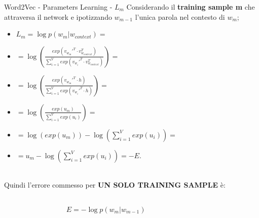 \documentclass[british]{beamer}
\begin{document}
\begin{frame}{Word2Vec - Parameters Learning - \(L_m\)}
	Considerando il \textbf{training sample m} che attraversa il network e ipotizzando \(w_{m-1}\) l'unica parola nel contesto di \(w_{m}\);
	\begin{itemize}
		\item \(L_m = \log p(w_{m}|w_{context}) = \)
		\item \(= \log \left( \frac{exp(v_{w_{m}}'^T \cdot v_{w_{context}}^T)}{\sum_{i=1}^{V} exp(v_{w_{i}}'^T \cdot v_{w_{context}}^T)} \right) =\) 
		\item \(= \log \left( \frac{exp(v_{w_{m}}'^T \cdot h)}{\sum_{i=1}^{V} exp(v_{w_{i}}'^T \cdot h)} \right) = \)
		\item \(= \log \left( \frac{exp(u_m)}{\sum_{i=1}^{V} exp(u_i)} \right) = \)
		\item \(= \log \left( exp(u_m) \right) - \log \left( \sum_{i=1}^{V} exp(u_i) \right) = \)
		\item \(= u_m - \log \left( \sum_{i=1}^{V} exp(u_i) \right) = -E. \)
		\\~\\
	\end{itemize}
	Quindi l'errore commesso per \textbf{UN SOLO TRAINING SAMPLE} \`{e}:
	\begin{columns}
		\begin{column}{0.3\textwidth}
			
		\end{column}
		\begin{column}{0.4\textwidth}
			\(E = -\log p(w_{m}|w_{m-1})\)
		\end{column}
		\begin{column}{0.3\textwidth}
			
		\end{column}
	\end{columns}
\end{frame}
\end{document}
